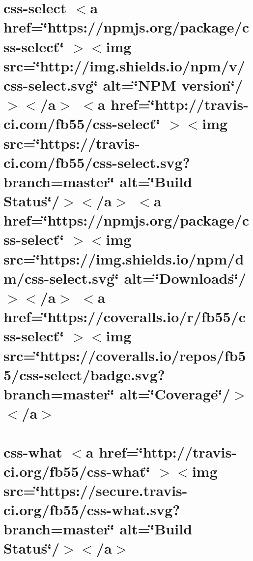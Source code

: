 \documentclass[twoside]{book}
\newcommand{\+}{\discretionary{\mbox{\scriptsize$\hookleftarrow$}}{}{}}
\begin{document}
\chapter{css-\/select \texorpdfstring{$<$}{<}a href=\char`\"{}https\+://npmjs.\+org/package/css-\/select\char`\"{} \texorpdfstring{$>$}{>}\texorpdfstring{$<$}{<}img src=\char`\"{}http\+://img.\+shields.\+io/npm/v/css-\/select.\+svg\char`\"{} alt=\char`\"{}\+NPM version\char`\"{}/\texorpdfstring{$>$}{>}\texorpdfstring{$<$}{<}/a\texorpdfstring{$>$}{>} \texorpdfstring{$<$}{<}a href=\char`\"{}http\+://travis-\/ci.\+com/fb55/css-\/select\char`\"{} \texorpdfstring{$>$}{>}\texorpdfstring{$<$}{<}img src=\char`\"{}https\+://travis-\/ci.\+com/fb55/css-\/select.\+svg?branch=master\char`\"{} alt=\char`\"{}\+Build Status\char`\"{}/\texorpdfstring{$>$}{>}\texorpdfstring{$<$}{<}/a\texorpdfstring{$>$}{>} \texorpdfstring{$<$}{<}a href=\char`\"{}https\+://npmjs.\+org/package/css-\/select\char`\"{} \texorpdfstring{$>$}{>}\texorpdfstring{$<$}{<}img src=\char`\"{}https\+://img.\+shields.\+io/npm/dm/css-\/select.\+svg\char`\"{} alt=\char`\"{}\+Downloads\char`\"{}/\texorpdfstring{$>$}{>}\texorpdfstring{$<$}{<}/a\texorpdfstring{$>$}{>} \texorpdfstring{$<$}{<}a href=\char`\"{}https\+://coveralls.\+io/r/fb55/css-\/select\char`\"{} \texorpdfstring{$>$}{>}\texorpdfstring{$<$}{<}img src=\char`\"{}https\+://coveralls.\+io/repos/fb55/css-\/select/badge.\+svg?branch=master\char`\"{} alt=\char`\"{}\+Coverage\char`\"{}/\texorpdfstring{$>$}{>}\texorpdfstring{$<$}{<}/a\texorpdfstring{$>$}{>}}
\label{md__c___users_vaishnavi_jadhav__desktop__developer_code_mean_stack_example_client_node_modules_css_select__r_e_a_d_m_e}

\chapter{css-\/what \texorpdfstring{$<$}{<}a href=\char`\"{}http\+://travis-\/ci.\+org/fb55/css-\/what\char`\"{} \texorpdfstring{$>$}{>}\texorpdfstring{$<$}{<}img src=\char`\"{}https\+://secure.\+travis-\/ci.\+org/fb55/css-\/what.\+svg?branch=master\char`\"{} alt=\char`\"{}\+Build Status\char`\"{}/\texorpdfstring{$>$}{>}\texorpdfstring{$<$}{<}/a\texorpdfstring{$>$}{>}}
\label{md__c___users_vaishnavi_jadhav__desktop__developer_code_mean_stack_example_client_node_modules_css_what_readme}

\end{document}
